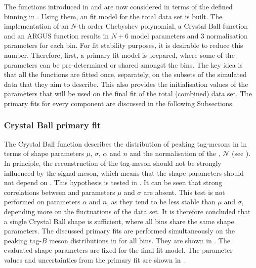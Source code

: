 The functions introduced in  and  are now considered in terms of the defined binning in .
Using them, an \Mbc fit model for the total data set is built.
The implementation of an $N$-th order Chebyshev polynomial, a Crystal Ball function and an ARGUS function results
in $N+6$ model parameters and 3 normalisation parameters for each \EB bin.
For fit stability purposes, it is desirable to reduce this number.
Therefore, first, a primary fit model is prepared, where some of the parameters can be pre-determined or shared amongst the bins.
The key idea is that all the functions are fitted once, separately, on the subsets of the simulated data that they aim to describe.
This also provides the initialisation values of the parameters that will be used on the final fit of the total (combined) data set.
The primary fits for every component are discussed in the following Subsections.

\subsubsection{Crystal Ball primary fit}\label{sec:crystal_ball_prefit}

The Crystal Ball function describes the distribution of peaking tag-\B mesons in \Mbc in terms of shape parameters $\mu$, $\sigma$, $\alpha$ and $n$ and the normalisation of the \PDF, $\mathcal{N}$ (see ).
In principle, the reconstruction of the tag-\B meson should not be strongly influenced by the signal-\B meson, which means that the shape parameters should not depend on \EB.
This hypothesis is tested in .
It can be seen that strong correlations between \EB and parameters $\mu$ and $\sigma$ are absent.
This test is not performed on parameters $\alpha$ and $n$, as they tend to be less stable than $\mu$ and $\sigma$, depending more on the fluctuations of the data set.
It is therefore concluded that a single Crystal Ball shape is sufficient, where all \EB bins share the same shape parameters.
The discussed primary fits are performed simultaneously on the peaking tag-$B$ meson \Mbc distributions in \MC for all \EB bins.
They are shown in .
The evaluated shape parameters are fixed for the final \Mbc fit model.
The parameter values and uncertainties from the primary fit are shown in .

